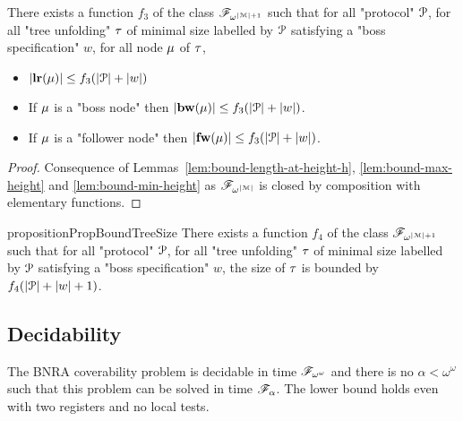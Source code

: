 \begin{corollary}
	\label{cor:bound-node-size}
	There exists a function $f_3$ of the class $\mathscr{F}_{\omega^{|\mathcal{M}|+1}}$ such that for all "protocol" $\mathcal{P}$, for all "tree unfolding" $\tau$ of minimal size labelled by $\mathcal{P}$ satisfying a "boss specification" $w$, for all node $\mu$ of $\tau$,
	
		\begin{itemize}
		\item $|\mathbf{lr}(\mu)| \leq f_3(|\mathcal{P}|+ |w|)$
			
		\item If $\mu$ is a "boss node" then $|\mathbf{bw}(\mu)| \leq f_3(|\mathcal{P}|+ |w|)$.
		
		\item If $\mu$ is a "follower node" then $|\mathbf{fw}(\mu)| \leq f_3(|\mathcal{P}|+ |w|)$.
	\end{itemize} 
\end{corollary}

\ifproofs
\begin{proof}
	Consequence of Lemmas~\ref{lem:bound-length-at-height-h}, \ref{lem:bound-max-height} and \ref{lem:bound-min-height} as $\mathscr{F}_{\omega^{|\mathcal{M}|}}$ is closed by composition with elementary functions.
\end{proof}
\fi
\begin{restatable}{proposition}{PropBoundTreeSize}
	\label{prop:bound-tree-size}
	There exists a function $f_4$ of the class $\mathscr{F}_{\omega^{|\mathcal{M}|+1}}$ such that for all "protocol" $\mathcal{P}$, for all "tree unfolding" $\tau$ of minimal size labelled by $\mathcal{P}$ satisfying a "boss specification" $w$, the size of $\tau$ is bounded by $f_4(|\mathcal{P}| + |w|+1)$.
\end{restatable}




\subsection{Decidability}
\begin{theorem}
	The BNRA coverability problem is decidable in time $\mathscr{F}_{\omega^\omega}$ and there is no $\alpha < \omega^\omega$ such that this problem can be solved in time $\mathscr{F}_{\alpha}$.
	The lower bound holds even with two registers and no local tests.
\end{theorem}

